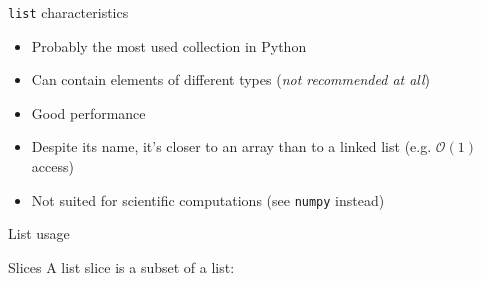 \begin{frame}{\texttt{list} characteristics}
  \begin{itemize}
    \item Probably the most used collection in Python
    \item Can contain elements of different types (\emph{not recommended at all})
    \item Good performance
    \item Despite its name, it's closer to an array than to a linked list (e.g. $\mathcal{O}(1)$ access)
    \item Not suited for scientific computations (see \texttt{numpy} instead)
  \end{itemize}
\end{frame}

\begin{frame}{List usage}
\end{frame}

\begin{frame}{Slices}
  A list slice is a subset of a list:
\end{frame}
